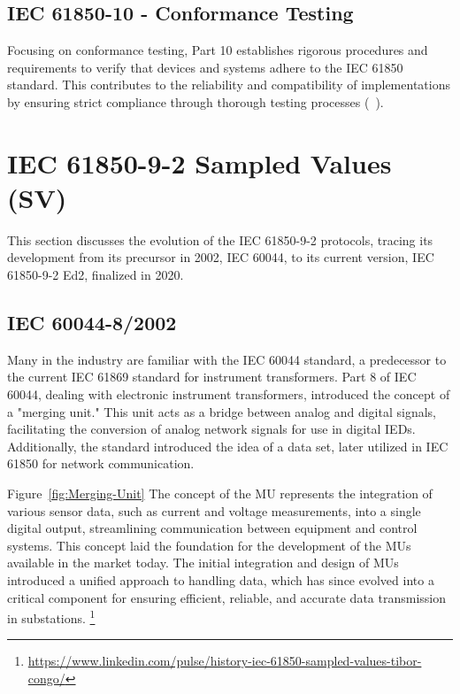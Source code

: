 \subsection{IEC 61850-10 - Conformance Testing}

Focusing on conformance testing, Part 10 establishes rigorous procedures and requirements to verify that devices and systems adhere to the IEC 61850 standard. This contributes to the reliability and compatibility of implementations by ensuring strict compliance through thorough testing processes (~\cite{Overview_of_IEC_61850_and_Benefits}).

\section{IEC 61850-9-2 Sampled Values (SV)}

This section discusses the evolution of the IEC 61850-9-2 protocols, tracing its development from its precursor in 2002, IEC 60044, to its current version, IEC 61850-9-2 Ed2, finalized in 2020.

\subsection{IEC 60044-8/2002}

Many in the industry are familiar with the IEC 60044 standard, a predecessor to the current IEC 61869 standard for instrument transformers. Part 8 of IEC 60044, dealing with electronic instrument transformers, introduced the concept of a "merging unit." This unit acts as a bridge between analog and digital signals, facilitating the conversion of analog network signals for use in digital IEDs. Additionally, the standard introduced the idea of a data set, later utilized in IEC 61850 for network communication.

Figure~\ref{fig:Merging-Unit} The concept of the MU represents the integration of various sensor data, such as current and voltage measurements, into a single digital output, streamlining communication between equipment and control systems. This concept laid the foundation for the development of the MUs available in the market today. The initial integration and design of MUs introduced a unified approach to handling data, which has since evolved into a critical component for ensuring efficient, reliable, and accurate data transmission in substations. \footnote{\url{https://www.linkedin.com/pulse/history-iec-61850-sampled-values-tibor-congo/}}

